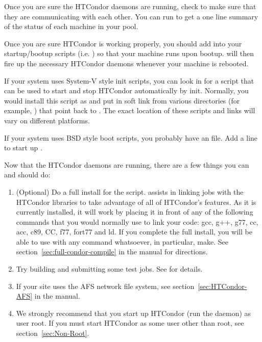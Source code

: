Once you are sure the HTCondor daemons are running, check to make sure
that they are communicating with each other.  You can run
 to get a one line summary of the status of each
machine in your pool.

Once you are sure HTCondor is working properly, you should add
 into your startup/bootup scripts (i.e.  ) so
that your machine runs  upon bootup.  
will then fire up the necessary HTCondor daemons whenever your machine
is rebooted.  

If your system uses System-V style init scripts, you can look in
 for a script that can be used
to start and stop HTCondor automatically by init.  Normally, you would
install this script as  and put in soft link from
various directories (for example, ) that point back to
.  The exact location of these scripts and links
will vary on different platforms.

If your system uses BSD style boot scripts, you probably have an
 file.  Add a line to start up
.


Now that the HTCondor daemons are running, there are a few things you
can and should do:

\begin{enumerate}
\item (Optional) Do a full install for the  script.
     assists in linking jobs with the HTCondor libraries
    to take advantage of all of HTCondor's features.  As it is currently
    installed, it will work by placing it in front of any of the
    following commands that you would normally use to link your code:
    gcc, g++, g77, cc, acc, c89, CC, f77, fort77 and ld.  If you
    complete the full install, you will be able to use
     with any command whatsoever, in particular, make.
    See section~\ref{sec:full-condor-compile} in the manual for directions.

\item Try building and submitting some test jobs.  See
     for details.

\item If your site uses the AFS network file system, see
section~\ref{sec:HTCondor-AFS} in the
manual.

\item We strongly recommend that you start up HTCondor (run the
 daemon) as user root.  If you must start HTCondor as
some user other than root, see section~\ref{sec:Non-Root}.

\end{enumerate}

